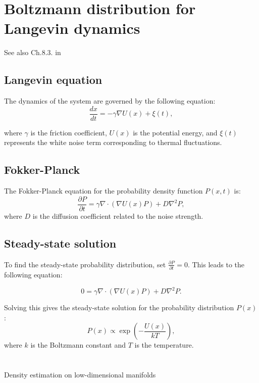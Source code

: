 \documentclass{article}
\theoremstyle{definition} \newtheorem{definition}{Definition}
\theoremstyle{remark} \newtheorem{remark}{Remark}
\newcounter{ct}
\begin{document}
\newpage




\newpage
\appendix

\section{Boltzmann distribution for Langevin dynamics}
See also Ch.8.3. in \citep{villani2021topics}
\subsection{Langevin equation}
The dynamics of the system are governed by the following equation:
\begin{equation}
    \frac{dx}{dt} = - \gamma \nabla U(x) + \xi(t),
\end{equation}

where $\gamma$ is the friction coefficient, $U(x)$ is the potential energy, and $\xi(t)$ represents the white noise term corresponding to thermal fluctuations.

\subsection{Fokker-Planck}
The Fokker-Planck equation for the probability density function $P(x,t)$ is:
\begin{equation}
    \frac{\partial P}{\partial t} = \gamma \nabla \cdot \left( \nabla U(x) P \right) + D \nabla^2 P,
\end{equation}
where $D$ is the diffusion coefficient related to the noise strength.

\subsection{Steady-state solution}
To find the steady-state probability distribution, set $\frac{\partial P}{\partial t} = 0$. This leads to the following equation:

\begin{equation}
    0 = \gamma \nabla \cdot \left( \nabla U(x) P \right) + D \nabla^2 P.
\end{equation}

Solving this gives the steady-state solution for the probability distribution $P(x)$:
\begin{equation}
    P(x) \propto \exp \left( - \frac{U(x)}{kT} \right),
\end{equation}
where $k$ is the Boltzmann constant and $T$ is the temperature.


\section{}
Density estimation on low-dimensional manifolds\citep{horvat2023density}
\end{document}
